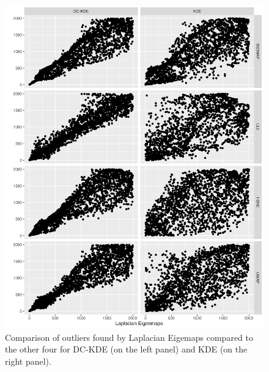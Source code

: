 \documentclass[12pt]{article}
\begin{document}
\begin{figure}

{\centering \includegraphics[width=0.95\linewidth]{figures/Twin Peak2000_density_compare_levs4ml_radius8_r0_5_rank} 

}

\caption{Comparison of outliers found by Laplacian Eigemaps compared to the other four for DC-KDE (on the left panel) and KDE (on the right panel).}\label{fig:tplevs4ml}
\end{figure}
\end{document}
